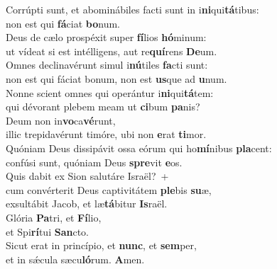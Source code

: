 \evenverse Corrúpti sunt, et abominábiles facti sunt in i\textbf{ni}qui\textbf{tá}tibus:~\*\\
\evenverse non est qui \textbf{fá}ciat \textbf{bo}num.\\
\oddverse Deus de cælo prospéxit super \textbf{fí}lios \textbf{hó}minum:~\*\\
\oddverse ut vídeat si est intélligens, aut re\textbf{quí}rens \textbf{De}um.\\
\evenverse Omnes declinavérunt simul i\textbf{nú}tiles \textbf{fa}cti sunt:~\*\\
\evenverse non est qui fáciat bonum, non est \textbf{us}que ad \textbf{u}num.\\
\oddverse Nonne scient omnes qui operántur i\textbf{ni}qui\textbf{tá}tem:~\*\\
\oddverse qui dévorant plebem meam ut \textbf{ci}bum \textbf{pa}nis?\\
\evenverse Deum non in\textbf{vo}ca\textbf{vé}runt,~\*\\
\evenverse illic trepidavérunt timóre, ubi non \textbf{e}rat \textbf{ti}mor.\\
\oddverse Quóniam Deus dissipávit ossa eórum qui ho\textbf{mí}nibus \textbf{pla}cent:~\*\\
\oddverse confúsi sunt, quóniam Deus \textbf{spre}vit \textbf{e}os.\\
\evenverse Quis dabit ex Sion salutáre Israël?~+\\
\evenverse  cum convérterit Deus captivitátem \textbf{ple}bis \textbf{su}æ,~\*\\
\evenverse exsultábit Jacob, et læ\textbf{tá}bitur \textbf{Is}raël.\\
\oddverse Glória \textbf{Pa}tri, et \textbf{Fí}lio,~\*\\
\oddverse et Spi\textbf{rí}tui \textbf{San}cto.\\
\evenverse Sicut erat in princípio, et \textbf{nunc}, et \textbf{sem}per,~\*\\
\evenverse et in sǽcula sæcu\textbf{ló}rum. \textbf{A}men.\\
